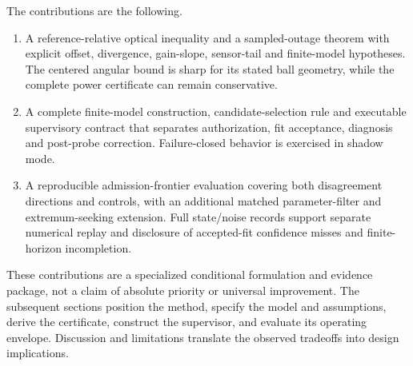 The contributions are the following.
\begin{enumerate}
\item A reference-relative optical inequality and a sampled-outage theorem with explicit offset, divergence, gain-slope, sensor-tail and finite-model hypotheses. The centered angular bound is sharp for its stated ball geometry, while the complete power certificate can remain conservative.
\item A complete finite-model construction, candidate-selection rule and executable supervisory contract that separates authorization, fit acceptance, diagnosis and post-probe correction. Failure-closed behavior is exercised in shadow mode.
\item A reproducible admission-frontier evaluation covering both disagreement directions and controls, with an additional matched parameter-filter and extremum-seeking extension. Full state/noise records support separate numerical replay and disclosure of accepted-fit confidence misses and finite-horizon incompletion.
\end{enumerate}
These contributions are a specialized conditional formulation and evidence package, not a claim of absolute priority or universal improvement. The subsequent sections position the method, specify the model and assumptions, derive the certificate, construct the supervisor, and evaluate its operating envelope. Discussion and limitations translate the observed tradeoffs into design implications.

